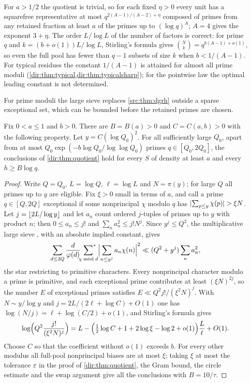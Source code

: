 For $a>1/2$ the quotient is trivial, so for each fixed $\eta>0$ every unit has a squarefree
representative at most $q^{2(A-1)/(A-2)+\eta}$ composed of primes from any retained fraction at
least $a$ of the primes up to $(\log q)^A$; $A=4$ gives the exponent $3+\eta$. The order
$L/\log L$ of the number of factors is correct: for prime $q$ and $k=(b+o(1))L/\log L$,
Stirling's formula gives $\binom Nk=q^{b(A-1)+o(1)}$, so even the full pool has fewer than
$q-1$ subsets of size $k$ when $b<1/(A-1)$. For typical residues the constant $1/(A-1)$ is attained
for almost all prime moduli (\cref{dir:thm:typical,dir:thm:typicalsharp}); for the pointwise law the
optimal leading constant is not determined.

For prime moduli the large sieve replaces \cref{src:thm:dgrh} outside a sparse exceptional set,
which can be bounded before the retained primes are chosen.

\begin{theorem}\label{dir:thm:almostall}
Fix $0<a\le1$ and $b>0$. There are $B=B(a)>0$ and $C=C(a,b)>0$ with the following property.
Let $y=C(\log Q_0)^2$. For all sufficiently large $Q_0$, apart from at most
$Q_0\exp(-b\log Q_0/\log\log Q_0)$ primes $q\in[Q_0,2Q_0]$, the conclusions of
\cref{dir:thm:quotient} hold for every $S$ of density at least $a$ and every $h\ge B\log q$.
\end{theorem}

\begin{proof}
Write $Q=Q_0$, $L=\log Q$, $\ell=\log L$ and $N=\pi(y)$; for large $Q$ all primes up to $y$ are
eligible. Fix $\xi>0$ small in terms of $a$, and call a prime $q\in[Q,2Q]$ exceptional if some
nonprincipal $\chi$ modulo $q$ has $\lvert\sum_{p\le y}\chi(p)\rvert>\xi N$. Let $j=\lfloor2L/\log y\rfloor$
and let $a_n$ count ordered $j$-tuples of primes up to $y$ with product $n$; then
$0\le a_n\le j!$ and $\sum_na_n^2\le j!N^j$. Since $y^j\le Q^2$, the multiplicative large sieve
\cite[Theorem~25.15]{Koukoulopoulos2019Distribution}, with an absolute implied constant,
gives
\[
 \sum_{d\le2Q}\frac d{\varphi(d)}\sideset{}{^*}\sum_{\chi\bmod d}
 \Bigl|\sum_{n\le y^j}a_n\chi(n)\Bigr|^2\ll(Q^2+y^j)\sum_na_n^2,
\]
the star restricting to primitive characters. Every nonprincipal character modulo a prime is
primitive, and each exceptional prime contributes at least $(\xi N)^{2j}$, so the number $E$ of
exceptional primes satisfies $E\ll Q^2j!/(\xi^2N)^j$. With $N\sim y/\log y$ and
$j=2L/(2\ell+\log C)+O(1)$ one has $\log(N/j)=\ell+\log(C/2)+o(1)$, and Stirling's formula
gives
\[
 \log\Bigl(Q^2\frac{j!}{(\xi^2N)^j}\Bigr)
 =L-\Bigl(\tfrac12\log C+1+2\log\xi-\log2+o(1)\Bigr)\frac L\ell+O(1).
\]
Choose $C$ so that the coefficient without $o(1)$ exceeds $b$. For every other modulus all
full-pool nonprincipal biases are at most $\xi$; taking $\xi$ at most the tolerance $\varepsilon$ in
the proof of \cref{dir:thm:quotient}, the Gram bound, the circle estimate and the swap argument
give all the conclusions with $B=10/\tau$.
\end{proof}

